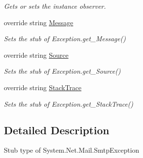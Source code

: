\begin{DoxyCompactItemize}
\begin{DoxyCompactList}\small\item\em Gets or sets the instance observer.\end{DoxyCompactList}\item 
override string \hyperlink{class_system_1_1_net_1_1_mail_1_1_fakes_1_1_stub_smtp_exception_acce6cc97e06b64ad1c087974d8485c18}{Message}
\begin{DoxyCompactList}\small\item\em Sets the stub of Exception.\-get\-\_\-\-Message()\end{DoxyCompactList}\item 
override string \hyperlink{class_system_1_1_net_1_1_mail_1_1_fakes_1_1_stub_smtp_exception_a41531ca820d13cc29cbdef53e9dcafca}{Source}
\begin{DoxyCompactList}\small\item\em Sets the stub of Exception.\-get\-\_\-\-Source()\end{DoxyCompactList}\item 
override string \hyperlink{class_system_1_1_net_1_1_mail_1_1_fakes_1_1_stub_smtp_exception_a0e7222ada78173439be8bfaace282b3e}{Stack\-Trace}
\begin{DoxyCompactList}\small\item\em Sets the stub of Exception.\-get\-\_\-\-Stack\-Trace()\end{DoxyCompactList}\end{DoxyCompactItemize}


\subsection{Detailed Description}
Stub type of System.\-Net.\-Mail.\-Smtp\-Exception



